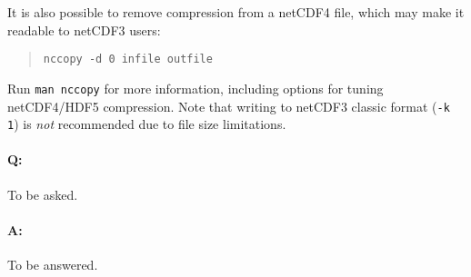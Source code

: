It is also possible to remove compression from a netCDF4 file, which may make
it readable to netCDF3 users:

\begin{quote}
\texttt{nccopy -d 0 infile outfile}
\end{quote}

Run \texttt{man nccopy} for more information, including options for tuning 
netCDF4/HDF5 compression. Note that writing to netCDF3 classic format 
(\texttt{-k 1}) is \emph{not} recommended due to file size limitations. 

\paragraph{Q:} To be asked.

\paragraph{A:} To be answered.


